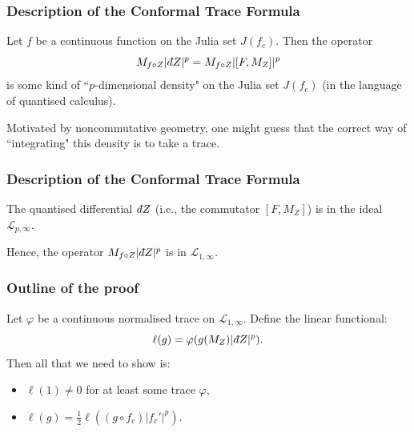\documentclass{beamer} %
\theoremstyle{definition} %
\newcommand{\Lc}{\mathcal{L}}
\def\qd{\,{\mathchar'26\mkern-12mu d}}
\begin{document}
\begin{frame}\frametitle{Description of the Conformal Trace Formula}
     Let $f$ be a continuous function on the Julia set $J(f_c)$. Then the operator
     \begin{equation*}
        M_{f\circ Z}|\qd Z|^p = M_{f\circ Z}|[F,M_Z]|^p
     \end{equation*}
     is some kind of ``$p$-dimensional density" on the Julia set $J(f_c)$ (in the language of quantised calculus).
     
     Motivated by noncommutative geometry, one might guess that the correct way of ``integrating" this density is to take a trace.
\end{frame}

\begin{frame}\frametitle{Description of the Conformal Trace Formula}
    \begin{lemma}
        The quantised differential $\qd Z$ (i.e., the commutator $[F,M_Z]$) is in the ideal $\Lc_{p,\infty}$.
    \end{lemma}
    Hence, the operator $M_{f\circ Z}|\qd Z|^p$ is in $\Lc_{1,\infty}$.
\end{frame}

\begin{frame}\frametitle{Outline of the proof}
    Let $\varphi$ be a continuous normalised trace on $\Lc_{1,\infty}$. Define the linear functional:
    \begin{equation*}
        \ell(g) = \varphi(g(M_Z)|\qd Z|^p).
    \end{equation*}
    Then all that we need to show is:
    \begin{itemize}
        \item{} $\ell(1) \neq 0$ for at least some trace $\varphi$,
        \item{} $\ell(g) = \frac{1}{2}\ell((g\circ f_c)|f_c'|^p)$.
    \end{itemize}
\end{frame}
\end{document}
